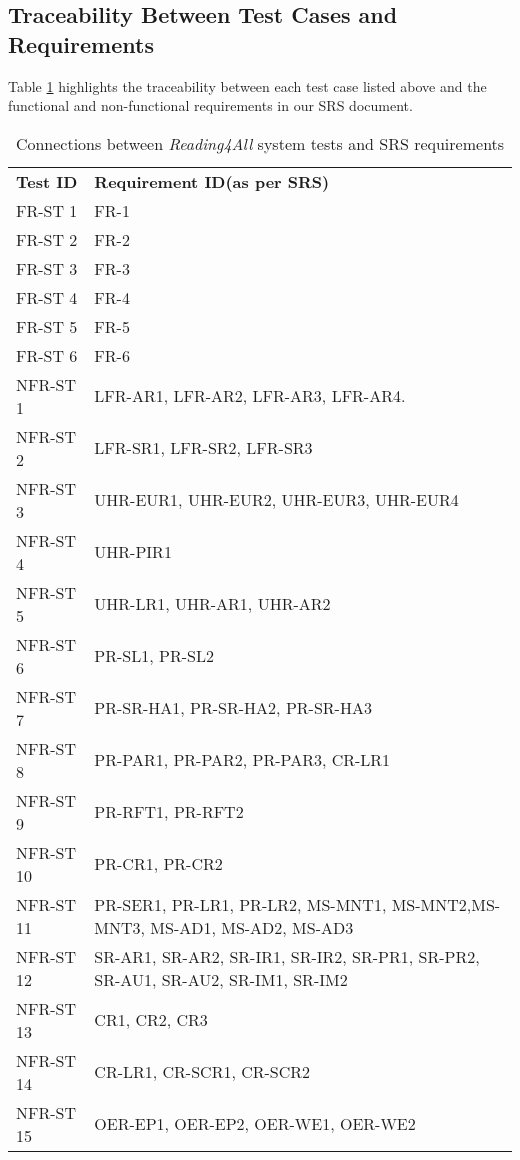 \documentclass[12pt, titlepage]{article}
\begin{document}
\subsection{Traceability Between Test Cases and Requirements}
Table \ref{tab:sys-tests} highlights the traceability between each test case listed above and 
the functional and non-functional requirements in our SRS document. 

\begin{longtable}{|p{6.0cm}|p{8.0cm}|}
  \captionsetup{justification=raggedright,singlelinecheck=false}
  \caption{Connections between \textit{Reading4All} system tests and
  SRS requirements}
  \label{tab:sys-tests} \\
  \toprule
  {\textbf{Test ID}} & {\textbf{Requirement ID(as per SRS)}}\\
  \midrule
  FR-ST 1 & FR-1 \\ \hline
  FR-ST 2 & FR-2 \\ \hline
  FR-ST 3 & FR-3 \\ \hline
  FR-ST 4 & FR-4 \\ \hline
  FR-ST 5 & FR-5 \\ \hline
  FR-ST 6 & FR-6 \\ \hline
  NFR-ST 1 & LFR-AR1, LFR-AR2, LFR-AR3, LFR-AR4. \\ \hline
  NFR-ST 2 & LFR-SR1, LFR-SR2, LFR-SR3 \\ \hline
  NFR-ST 3 & UHR-EUR1, UHR-EUR2, UHR-EUR3, UHR-EUR4 \\ \hline
  NFR-ST 4 & UHR-PIR1 \\ \hline
  NFR-ST 5 & UHR-LR1, UHR-AR1, UHR-AR2\\ \hline
  NFR-ST 6 & PR-SL1, PR-SL2\\ \hline
  NFR-ST 7 & PR-SR-HA1, PR-SR-HA2, PR-SR-HA3 \\ \hline
  NFR-ST 8 & PR-PAR1, PR-PAR2, PR-PAR3, CR-LR1 \\ \hline
  NFR-ST 9 & PR-RFT1, PR-RFT2 \\ \hline
  NFR-ST 10 & PR-CR1, PR-CR2 \\ \hline
  NFR-ST 11 & PR-SER1, PR-LR1, PR-LR2, MS-MNT1, MS-MNT2,MS-MNT3, MS-AD1, MS-AD2, MS-AD3 \\ \hline
  NFR-ST 12 & SR-AR1, SR-AR2, SR-IR1, SR-IR2, SR-PR1, SR-PR2, SR-AU1, SR-AU2, SR-IM1, SR-IM2 \\ \hline
  NFR-ST 13 & CR1, CR2, CR3 \\ \hline
  NFR-ST 14 & CR-LR1, CR-SCR1, CR-SCR2 \\ \hline
  NFR-ST 15 & OER-EP1, OER-EP2, OER-WE1, OER-WE2 \\ \hline

\end{longtable}
\end{document}
